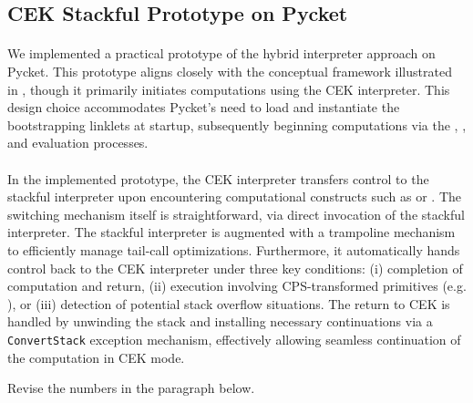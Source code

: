     \subsection{CEK \+ Stackful Prototype on Pycket}

      \paragraph{}%
        We implemented a practical prototype of the hybrid interpreter approach on Pycket. This prototype aligns closely with the conceptual framework illustrated in , though it primarily initiates computations using the CEK interpreter. This design choice accommodates Pycket's need to load and instantiate the bootstrapping linklets at startup, subsequently beginning computations via the , , and evaluation processes.

      \paragraph{}%
        In the implemented prototype, the CEK interpreter transfers control to the stackful interpreter upon encountering computational constructs such as  or . The switching mechanism itself is straightforward, via direct invocation of the stackful interpreter. The stackful interpreter is augmented with a trampoline mechanism to efficiently manage tail-call optimizations. Furthermore, it automatically hands control back to the CEK interpreter under three key conditions: (i) completion of computation and return, (ii) execution involving CPS-transformed primitives (e.g. ), or (iii) detection of potential stack overflow situations. The return to CEK is handled by unwinding the stack and installing necessary continuations via a \verb|ConvertStack| exception mechanism, effectively allowing seamless continuation of the computation in CEK mode.

      \begin{todo}
        Revise the numbers in the paragraph below.
      \end{todo}

